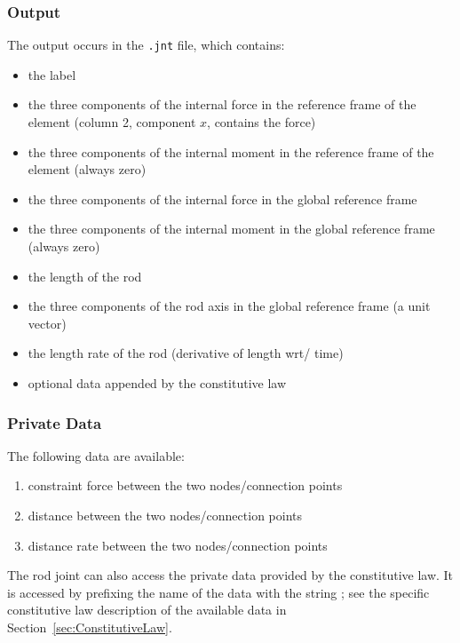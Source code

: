 \subsubsection{Output}
The output occurs in the \texttt{.jnt} file, which contains:
\begin{itemize}
\item the label
\item the three components of the internal force in the reference frame
of the element (column 2, component $x$, contains the force)
\item the three components of the internal moment in the reference frame
of the element (always zero)
\item the three components of the internal force in the global
reference frame
\item the three components of the internal moment in the global
reference frame (always zero)
\item the length of the rod
\item the three components of the rod axis in the global reference frame
(a unit vector)
\item the length rate of the rod (derivative of length wrt/ time)
\item optional data appended by the constitutive law
\end{itemize}

\subsubsection{Private Data}
The following data are available:
\begin{enumerate}
\item {} constraint force between the two nodes/connection points
\item {} distance between the two nodes/connection points
\item {} distance rate between the two nodes/connection points
\end{enumerate}
The rod joint can also access the private data provided 
by the constitutive law.
It is accessed by prefixing the name of the data with the string
; see the specific constitutive law
description of the available data in Section~\ref{sec:ConstitutiveLaw}.





